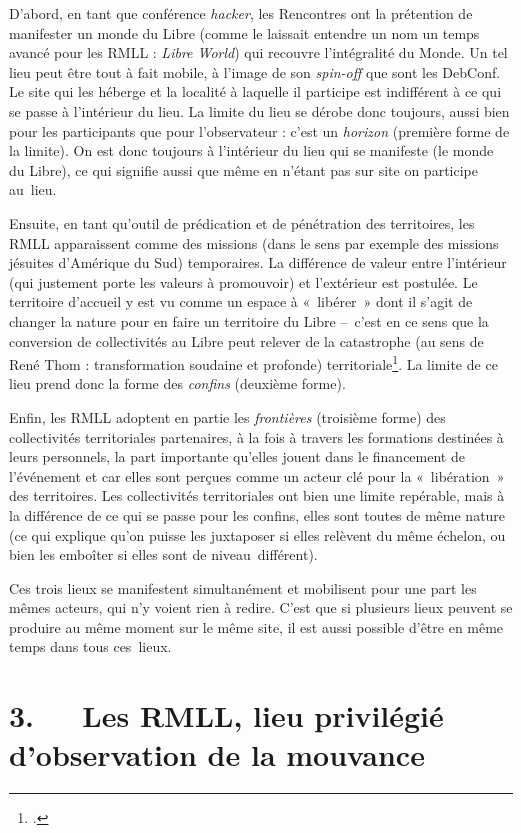 \documentclass{FramateX}
\begin{document}
\begin{refsection}
D'abord, en tant que conférence \textit{hacker}, les Rencontres ont la
prétention de manifester un monde du Libre (comme le laissait entendre
un nom un temps avancé pour les RMLL : \textit{Libre World}) qui recouvre
l'intégralité du Monde. Un tel lieu peut être tout à fait mobile, à
l'image de son \textit{spin-off} que sont les DebConf. Le site qui les
héberge et la localité à laquelle il participe est indifférent à ce qui
se passe à l'intérieur du lieu. La limite du lieu se dérobe donc
toujours, aussi bien pour les participants que pour l'observateur :
c'est un \textit{horizon} (première forme de la limite). On est donc
toujours à l'intérieur du lieu qui se manifeste (le monde du Libre), ce
qui signifie aussi que même en n'étant pas sur site on participe
au~lieu.

Ensuite, en tant qu'outil de prédication et de pénétration des
territoires, les RMLL apparaissent comme des missions (dans le sens par
exemple des missions jésuites d'Amérique du Sud) temporaires. La
différence de valeur entre l'intérieur (qui justement porte les valeurs
à promouvoir) et l'extérieur est postulée. Le territoire d'accueil y
est vu comme un espace à «~libérer~» dont il s'agit de changer la
nature pour en faire un territoire du Libre –~c'est en ce sens que la
conversion de collectivités au Libre peut relever de la catastrophe (au
sens de René Thom : transformation soudaine et profonde) territoriale\footnote{\cite[p.~36]{giraudles2010}.}. La limite de ce lieu prend donc la forme des
\textit{confins} (deuxième forme).

Enfin, les RMLL adoptent en partie les \textit{frontières} (troisième
forme) des collectivités territoriales partenaires, à la fois à travers
les formations destinées à leurs personnels, la part importante
qu'elles jouent dans le financement de l'événement et car elles sont
perçues comme un acteur clé pour la «~libération~» des territoires. Les
collectivités territoriales ont bien une limite repérable, mais à la
différence de ce qui se passe pour les confins, elles sont toutes de
même nature (ce qui explique qu'on puisse les juxtaposer si elles
relèvent du même échelon, ou bien les emboîter si elles sont de
niveau~différent).

Ces trois lieux se manifestent simultanément et mobilisent pour une part
les mêmes acteurs, qui n'y voient rien à redire. C'est que si plusieurs
lieux peuvent se produire au même moment sur le même site, il est aussi
possible d'être en même temps dans tous ces~lieux.

\section*{3.~~~Les RMLL, lieu privilégié d'observation de la mouvance}
{}


\end{refsection}
\end{document}
